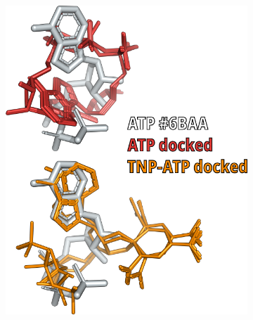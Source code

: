 \begin{figure}[h]
	\centering
	\begin{subfigure}[t]{0.28\textwidth}
		\caption{}\label{ch3fig:6baa_docking}
		\centering
		\includegraphics[width=\textwidth]{6baa_docking.pdf}
	\end{subfigure}
	\hfill
	\begin{subfigure}[t]{0.28\textwidth}
		\caption{}\label{ch3fig:6c3p_docking}
		\centering

\end{subfigure}
\end{figure}
